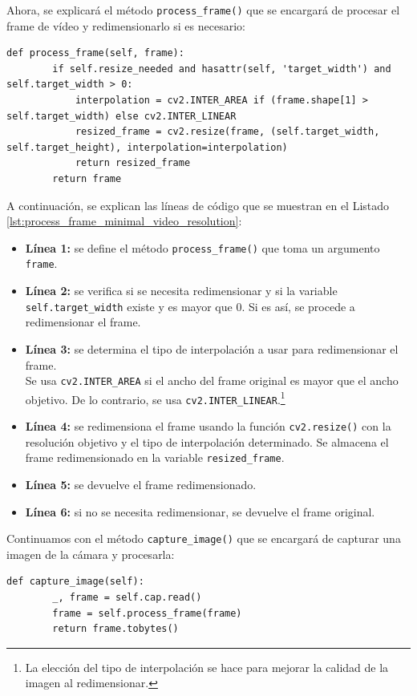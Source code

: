 Ahora, se explicará el método \texttt{process\_frame()} que se encargará de procesar el frame de vídeo y redimensionarlo si es necesario:
\begin{lstlisting}[style=pythonstyle, caption={Método \texttt{process\_frame()} de \textit{Minimal\_Video\_Resolution}.}, label={lst:process_frame_minimal_video_resolution}]
def process_frame(self, frame):
        if self.resize_needed and hasattr(self, 'target_width') and self.target_width > 0:
            interpolation = cv2.INTER_AREA if (frame.shape[1] > self.target_width) else cv2.INTER_LINEAR
            resized_frame = cv2.resize(frame, (self.target_width, self.target_height), interpolation=interpolation)
            return resized_frame
        return frame
\end{lstlisting}
\vspace{\baselineskip}

A continuación, se explican las líneas de código que se muestran en el Listado \ref{lst:process_frame_minimal_video_resolution}:
\begin{itemize}
    \item \textbf{Línea 1:} se define el método \texttt{process\_frame()} que toma un argumento \texttt{frame}.
    \item \textbf{Línea 2:} se verifica si se necesita redimensionar y si la variable \texttt{self.target\_width} existe y es mayor que 0. Si es así, se procede a redimensionar el frame.
    \item \textbf{Línea 3:} se determina el tipo de interpolación a usar para redimensionar el frame. \\
    Se usa \texttt{cv2.INTER\_AREA} si el ancho del frame original es mayor que el ancho objetivo. De lo contrario, se usa \texttt{cv2.INTER\_LINEAR}.\footnote{La elección del tipo de interpolación se hace para mejorar la calidad de la imagen al redimensionar.}
    \item \textbf{Línea 4:} se redimensiona el frame usando la función \texttt{cv2.resize()} con la resolución objetivo y el tipo de interpolación determinado. Se almacena el frame redimensionado en la variable \texttt{resized\_frame}.
    \item \textbf{Línea 5:} se devuelve el frame redimensionado.
    \item \textbf{Línea 6:} si no se necesita redimensionar, se devuelve el frame original.
\end{itemize}
\vspace{\baselineskip}

Continuamos con el método \texttt{capture\_image()} que se encargará de capturar una imagen de la cámara y procesarla:
\begin{lstlisting}[style=pythonstyle, caption={Método \texttt{capture\_image()} de \textit{Minimal\_Video\_Resolution}.}, label={lst:capture_image_minimal_video_resolution}]
def capture_image(self):
        _, frame = self.cap.read()
        frame = self.process_frame(frame)
        return frame.tobytes()
\end{lstlisting}
\vspace{\baselineskip}

